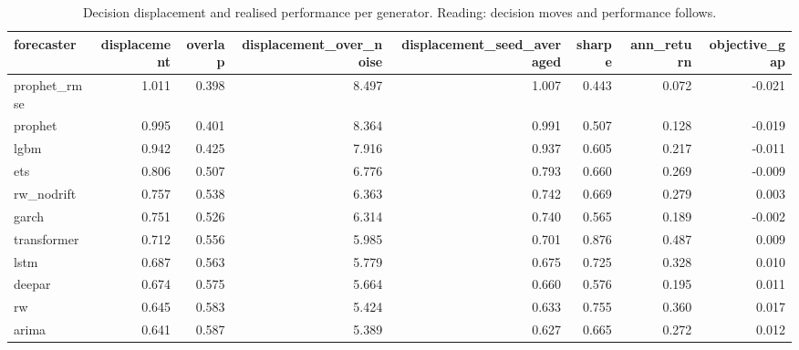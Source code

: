 \begin{table}
\caption{Decision displacement and realised performance per generator. Reading: decision moves and performance follows.}
\label{tab:sensitivity}
\begin{tabular}{lrrrrrrr}
\toprule
forecaster & displacement & overlap & displacement\_over\_noise & displacement\_seed\_averaged & sharpe & ann\_return & objective\_gap \\
\midrule
prophet\_rmse & 1.011 & 0.398 & 8.497 & 1.007 & 0.443 & 0.072 & -0.021 \\
prophet & 0.995 & 0.401 & 8.364 & 0.991 & 0.507 & 0.128 & -0.019 \\
lgbm & 0.942 & 0.425 & 7.916 & 0.937 & 0.605 & 0.217 & -0.011 \\
ets & 0.806 & 0.507 & 6.776 & 0.793 & 0.660 & 0.269 & -0.009 \\
rw\_nodrift & 0.757 & 0.538 & 6.363 & 0.742 & 0.669 & 0.279 & 0.003 \\
garch & 0.751 & 0.526 & 6.314 & 0.740 & 0.565 & 0.189 & -0.002 \\
transformer & 0.712 & 0.556 & 5.985 & 0.701 & 0.876 & 0.487 & 0.009 \\
lstm & 0.687 & 0.563 & 5.779 & 0.675 & 0.725 & 0.328 & 0.010 \\
deepar & 0.674 & 0.575 & 5.664 & 0.660 & 0.576 & 0.195 & 0.011 \\
rw & 0.645 & 0.583 & 5.424 & 0.633 & 0.755 & 0.360 & 0.017 \\
arima & 0.641 & 0.587 & 5.389 & 0.627 & 0.665 & 0.272 & 0.012 \\
\bottomrule
\end{tabular}
\end{table}
